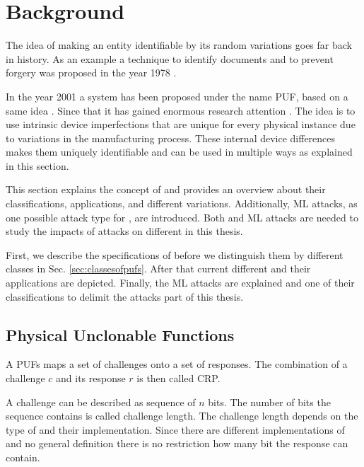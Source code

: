 \chapter{Background}
\label{cap:background}

The idea of making an entity identifiable by its random variations goes far back in history.
As an example a technique to identify documents and to prevent forgery was proposed in the year 1978 \cite{Brosow1980MethodForgery}.%

In the year 2001 a system has been proposed under the name \acf{PUF}, based on a same idea \cite{Pappu2001PhysicalFunctions}.
Since that it has gained enormous research attention \cite{Becker2015ThePUFs}. %
The idea is to use intrinsic device imperfections that are unique for every physical instance due to variations in the manufacturing process.
These internal device differences makes them uniquely identifiable and can be used in multiple ways as explained in this section.

This section explains the concept of \pufs and provides an overview about their classifications, applications, and different variations.
Additionally, \ac{ML} attacks, as one possible attack type for \pufs, are introduced.
Both \pufs and \ac{ML} attacks are needed to study the impacts of attacks on different \pufs in this thesis. %

First, we describe the specifications of \pufs before we distinguish them by different classes in Sec. \ref{sec:classesofpufs}.
After that current different \pufs and their applications are depicted.
Finally, the \ac{ML} attacks are explained and one of their classifications to delimit the attacks part of this thesis.


\section{Physical Unclonable Functions}
\label{sec:pyhsicalunclonablefunctions}

A \acfp{PUF} maps a set of challenges onto a set of responses.
The combination of a challenge $c$ and its response $r$ is then called \ac{CRP}. %

A challenge can be described as sequence of $n$ bits.
The number of bits the sequence contains is called challenge length. %
The challenge length depends on the type of \puf and their implementation.
Since there are different implementations of \pufs and no general definition there is no restriction how many bit the response can contain. %

